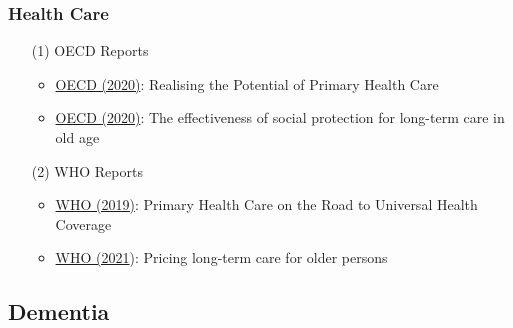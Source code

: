 \documentclass[12pt]{article}
\begin{document}
\subsubsection{Health Care}
\begin{itemize}
    \item[(1)] OECD Reports
    \begin{itemize}
        \item \href{https://www.oecd.org/health/realising-the-potential-of-primary-health-care-a92adee4-en.htm}{OECD (2020)}: Realising the Potential of Primary Health Care 
        \item \href{https://www.oecd-ilibrary.org/social-issues-migration-health/the-effectiveness-of-social-protection-for-long-term-care-in-old-age_2592f06e-en}{OECD (2020)}: The effectiveness of social protection for long-term care in old age
    \end{itemize}
    \item[(2)] WHO Reports
    \begin{itemize}
        \item \href{https://reliefweb.int/report/world/primary-health-care-road-universal-health-coverage-2019-monitoring-report?gclid=Cj0KCQjwxuCnBhDLARIsAB-cq1qV30mTC1t5TjL-RkcjWxleBoXakapGhTClr9koY2DUhv9VhiDio0saAozJEALw_wcB}{WHO (2019)}: Primary Health Care on the Road to Universal Health Coverage
        \item \href{https://apps.who.int/iris/handle/10665/344505}{WHO (2021}): Pricing long-term care for older persons
    \end{itemize}
\end{itemize}



\subsection{Dementia}
\end{document}
